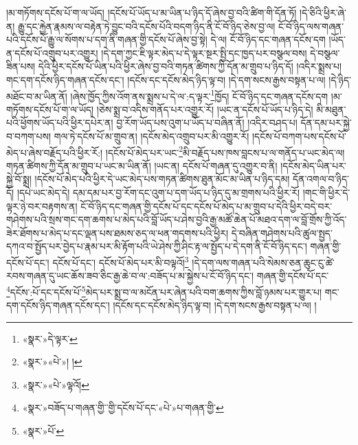 །མ་གཏོགས་དངོས་པོ་ག་ལ་ཡོད། །དངོས་པོ་ཡོད་པ་མ་ཡིན་པ་ཉིད་དོ་ཞེས་བྱ་བའི་ཚིག་གི་དོན་ཏོ། །དེ་ཅིའི་ཕྱིར་ཞེ་ན། རྒྱུ་དང་རྐྱེན་རྣམས་ལ་བརྟེན་ཏེ་བྱུང་བའི་དངོས་པོའི་བདག་ཉིད་ནི་ངོ་བོ་ཉིད་ཅེས་བྱ་ལ། ངོ་བོ་ཉིད་ལས་གཞན་པའི་དངོས་པོ་རྒྱུ་ལ་སོགས་པ་དག་ནི་གཞན་གྱི་དངོས་པོ་ཞེས་བྱ་སྟེ། དེ་ལ། ངོ་བོ་ཉིད་དང་གཞན་དངོས་དག །ཡོད་ན་དངོས་པོ་འགྲུབ་པར་འགྱུར། །དེ་དག་ཀྱང་ཇི་ལྟར་མེད་པ་དེ་ལྟར་སྔར་སྤྱི་དང་ཁྱད་པར་བསྩལ་བས། དེ་བསྩལ་ཟིན་པས། དེའི་ཕྱིར་དངོས་པོ་ཡིན་པའི་ཕྱིར་ཞེས་བྱ་བའི་གཏན་ཚིགས་ཀྱི་དོན་མ་གྲུབ་པ་ཉིད་དོ། །འདིར་སྨྲས་པ། གང་དག་དངོས་ཉིད་གཞན་དངོས་དང་། །དངོས་དང་དངོས་མེད་ཉིད་ལྟ་བ། །དེ་དག་སངས་རྒྱས་བསྟན་པ་ལ། །དེ་ཉིད་མཐོང་བ་མ་ཡིན་ནོ། །ཞེས་ཁྱོད་ཀྱིས་འོག་ནས་སྨྲས་པ་དེ་ལ་:ད་ལྟར་\footnote{«སྣར་»དེ་ལྟར་}ཁྱོད། ངོ་བོ་ཉིད་དང་གཞན་དངོས་དག །མ་གཏོགས་དངོས་པོ་ག་ལ་ཡོད། །ཅེས་སྨྲ་བ་འདིས་གནོད་པར་འགྱུར་རོ། །ཡང་ན་དངོས་པོ་ཡོད་པ་ཉིད་དེ། མི་མཐུན་པའི་ཕྱོགས་ཡོད་པའི་ཕྱིར་དཔེར་ན། བྱ་རོག་ཡོད་པས་འུག་པ་ཡོད་པ་བཞིན་ནོ། །འདིར་བཤད་པ། དོན་དམ་པར་སྐྱེ་བ་བཀག་པས། གལ་ཏེ་དངོས་པོ་མ་གྲུབ་ན། །དངོས་མེད་འགྲུབ་པར་མི་འགྱུར་རོ། །དངོས་པོ་བཀག་པས་དངོས་པོ་མེད་པ་ཞེས་བརྗོད་པའི་ཕྱིར་རོ:། །དངོས་པོ་མེད་པར་ཡང་\footnote{«སྣར་»«པེ་»། །}མི་བརྗོད་པས་ཁས་བླངས་པ་ལ་གནོད་པ་ཡང་མེད་ལ། གཏན་ཚིགས་ཀྱི་དོན་མ་གྲུབ་པ་ཡང་མ་ཡིན་ནོ། །ཡང་ན། དངོས་པོ་གཞན་དུ་འགྱུར་བ་ནི། །དངོས་མེད་ཡིན་པར་སྐྱེ་བོ་སྨྲ། །དངོས་པོ་མེད་པའི་ཕྱིར་དེ་ཡང་མེད་པས་གཏན་ཚིགས་ཐུན་མོང་མ་ཡིན་པ་ཉིད་དམ། དོན་འགལ་བ་ཉིད་དོ། །དཔེ་ཡང་མེད་དེ། དམ་དམ་པར་བྱ་རོག་དང་འུག་པ་དག་ཡོད་པ་ཉིད་དུ་མ་གྲགས་པའི་ཕྱིར་རོ། །གང་གི་ཕྱིར་དེ་ལྟར་ཉེ་བར་བརྟགས་ན། ངོ་བོ་ཉིད་དང་གཞན་གྱི་དངོས་པོ་དང་དངོས་པོ་མེད་པ་མ་གྲུབ་པ་དེའི་ཕྱིར་བདེ་བར་གཤེགས་པའི་སྲས་གང་དག་ཆགས་པ་མེད་པའི་བློ་ཡོད་པ་ཤེས་བྱའི་རྒྱ་མཚོ་ཆེན་པོ་མཐའ་དག་ལ་བློ་གྲོས་ཀྱི་འོད་ཟེར་ཐོགས་པ་མེད་པ་དང་ལྡན་པས་ཐམས་ཅད་ལ་ཕན་གདགས་པའི་ཕྱིར། དེ་བཞིན་གཤེགས་པའི་ཚུལ་སྤྱད་དཀའ་བ་སྤྱོད་པར་བྱེད་པ་རྣམ་པར་མི་རྟོག་པའི་ཡེ་ཤེས་ཀྱི་ཤིང་རྟ་ལ་སྤྱོད་པ་དེ་དག་ནི་ངོ་བོ་ཉིད་དང་། གཞན་གྱི་དངོས་པོ་དང་། དངོས་པོ་དང་། དངོས་པོ་མེད་པར་མི་བལྟའོ།\footnote{«སྣར་»«པེ་»ལྟའོ།} །དེ་དག་ལས་གཞན་པའི་སེམས་ཅན་ཆུང་ངུ་ཚེ་རབས་གཞན་དུ་ཡང་ཆོས་ཟབ་ཅིང་རྒྱ་ཆེ་བ་ལ་:བཟོད་པ་མ་སྐྱེས་པ་ངོ་བོ་ཉིད་དང་། གཞན་གྱི་དངོས་པོ་དང་\footnote{«སྣར་»བཟོད་པ་གཞན་གྱི་་གྱི་དངོས་པོ་དང་«པེ་»པ་གཞན་གྱི་}དངོས་:པོ་དང་དངོས་པོ་\footnote{«སྣར་»པོ་}མེད་པར་སྨྲ་བ་ལ་མངོན་པར་ཞེན་པའི་བག་ཆགས་ཀྱིས་བློ་ཉམས་པར་གྱུར་པ། གང་དག་དངོས་ཉིད་གཞན་དངོས་དང་། །དངོས་དང་དངོས་མེད་ཉིད་ལྟ་བ། །དེ་དག་སངས་རྒྱས་བསྟན་པ་ལ། །
